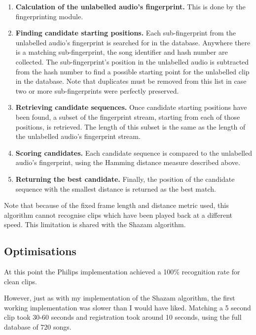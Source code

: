 \documentclass[12pt,a4paper,twoside,openright]{report}
\begin{document}
\begin{enumerate}

  \item \textbf{Calculation of the unlabelled audio's fingerprint.} This is done by the fingerprinting module.

  \item \textbf{Finding candidate starting positions.} Each sub-fingerprint from the unlabelled audio's fingerprint is searched for in the database. Anywhere there is a matching sub-fingerprint, the song identifier and hash number are collected. The sub-fingerprint's position in the unlabelled audio is subtracted from the hash number to find a possible starting point for the unlabelled clip in the database. Note that duplicates must be removed from this list in case two or more sub-fingerprints were perfectly preserved.

  \item \textbf{Retrieving candidate sequences.} Once candidate starting positions have been found, a subset of the fingerprint stream, starting from each of those positions, is retrieved. The length of this subset is the same as the length of the unlabelled audio's fingerprint stream.

  \item \textbf{Scoring candidates.} Each candidate sequence is compared to the unlabelled audio's fingerprint, using the Hamming distance measure described above.

  \item \textbf{Returning the best candidate.} Finally, the position of the candidate sequence with the smallest distance is returned as the best match.

\end{enumerate}

Note that because of the fixed frame length and distance metric used, this algorithm cannot recognise clips which have been played back at a different speed. This limitation is shared with the Shazam algorithm.

\subsection{Optimisations}

At this point the Philips implementation achieved a 100\% recognition rate for clean clips.

However, just as with my implementation of the Shazam algorithm, the first working implementation was slower than I would have liked. Matching a 5 second clip took 30-60 seconds and registration took around 10 seconds, using the full database of 720 songs.
\end{document}
